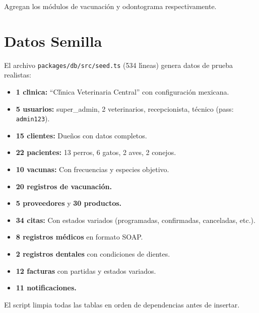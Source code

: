 Agregan los m\'odulos de vacunaci\'on y odontograma respectivamente.

\section{Datos Semilla}

El archivo \texttt{packages/db/src/seed.ts} (534 l\'{\i}neas) genera datos
de prueba realistas:

\begin{itemize}[leftmargin=*]
    \item \textbf{1 cl\'{\i}nica:} ``Cl\'{\i}nica Veterinaria Central'' con
          configuraci\'on mexicana.
    \item \textbf{5 usuarios:} super\_admin, 2 veterinarios, recepcionista,
          t\'ecnico (pass: \texttt{admin123}).
    \item \textbf{15 clientes:} Due\~nos con datos completos.
    \item \textbf{22 pacientes:} 13 perros, 6 gatos, 2 aves, 2 conejos.
    \item \textbf{10 vacunas:} Con frecuencias y especies objetivo.
    \item \textbf{20 registros de vacunaci\'on.}
    \item \textbf{5 proveedores} y \textbf{30 productos.}
    \item \textbf{34 citas:} Con estados variados (programadas, confirmadas,
          canceladas, etc.).
    \item \textbf{8 registros m\'edicos} en formato SOAP.
    \item \textbf{2 registros dentales} con condiciones de dientes.
    \item \textbf{12 facturas} con partidas y estados variados.
    \item \textbf{11 notificaciones.}
\end{itemize}

El script limpia todas las tablas en orden de dependencias antes de insertar.
